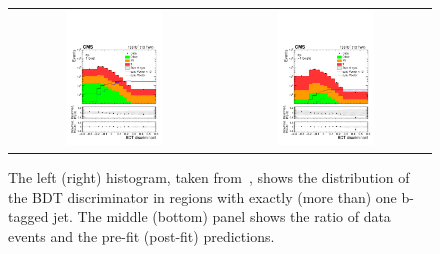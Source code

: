  \begin{figure}[tbh!]
 \begin{center}
 \begin{tabular}{cc}
 \includegraphics[width=0.48\textwidth]{figures/Part3/History/CMS_results1}&
 \includegraphics[width=0.48\textwidth]{figures/Part3/History/CMS_results2}\\
 \end{tabular}
 \caption{The left (right) histogram, taken from~\cite{CMS:2022ztx}, shows the distribution of the \ac{BDT} discriminator in regions with exactly (more than) one b-tagged jet. The middle (bottom) panel shows the ratio of data events and the pre-fit (post-fit) predictions.}
 \label{fig:CMS_results}
 \end{center}
\end{figure}

